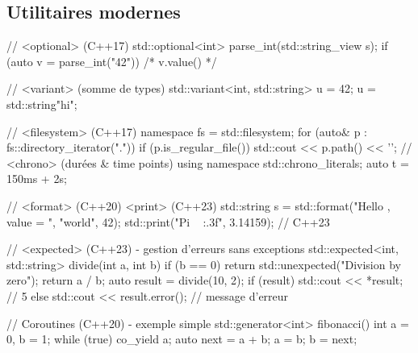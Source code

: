 \documentclass{article}
\begin{document}
\begin{multicols*}{4}





\section*{Utilitaires modernes}

\begin{cppcode}
// <optional> (C++17)
std::optional<int> parse_int(std::string_view s);
if (auto v = parse_int("42")) { /* v.value() */ }

// <variant> (somme de types)
std::variant<int, std::string> u = 42;
u = std::string{"hi"};

// <filesystem> (C++17)
namespace fs = std::filesystem;
for (auto& p : fs::directory_iterator(".")) {
    if (p.is_regular_file()) std::cout << p.path() << '\n';
}
// <chrono> (durées & time points)
using namespace std::chrono_literals;
auto t = 150ms + 2s;

// <format> (C++20) <print> (C++23)
std::string s = std::format("Hello {}, value = {}", "world", 42);
std::print("Pi ~ {:.3f}\n", 3.14159); // C++23

// <expected> (C++23) - gestion d'erreurs sans exceptions
std::expected<int, std::string> divide(int a, int b) {
    if (b == 0) return std::unexpected("Division by zero");
    return a / b;
}
auto result = divide(10, 2);
if (result) std::cout << *result; // 5
else std::cout << result.error(); // message d'erreur

// Coroutines (C++20) - exemple simple
std::generator<int> fibonacci() {
    int a = 0, b = 1;
    while (true) {
        co_yield a; auto next = a + b;
        a = b; b = next; } }
\end{cppcode}


\end{multicols*}
\end{document}
